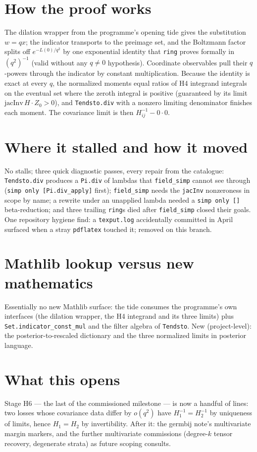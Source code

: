 \documentclass[11pt]{article}
\begin{document}
\section{How the proof works}

The dilation wrapper from the programme's opening tide gives the
substitution $w = qx$; the indicator transports to the preimage set,
and the Boltzmann factor splits off $e^{-L(0)/q^2}$ by one
exponential identity that \texttt{ring} proves formally in
$(q^2)^{-1}$ (valid without any $q \neq 0$ hypothesis). Coordinate
observables pull their $q$-powers through the indicator by constant
multiplication. Because the identity is exact at every $q$, the
normalized moments equal ratios of H4 integrand integrals on the
eventual set where the zeroth integral is positive (guaranteed by
its limit $\mathrm{jacInv}\,H \cdot Z_0 > 0$), and
\texttt{Tendsto.div} with a nonzero limiting denominator finishes
each moment. The covariance limit is then
$H^{-1}_{ij} - 0 \cdot 0$.

\section{Where it stalled and how it moved}

No stalls; three quick diagnostic passes, every repair from the
catalogue: \texttt{Tendsto.div} produces a \texttt{Pi.div} of
lambdas that \texttt{field\_simp} cannot see through
(\texttt{simp only [Pi.div\_apply]} first); \texttt{field\_simp}
needs the \texttt{jacInv} nonzeroness in scope by name; a rewrite
under an unapplied lambda needed a \texttt{simp only []}
beta-reduction; and three trailing \texttt{ring}s died after
\texttt{field\_simp} closed their goals. One repository hygiene find:
a \texttt{texput.log} accidentally committed in April surfaced when a
stray \texttt{pdflatex} touched it; removed on this branch.

\section{Mathlib lookup versus new mathematics}

Essentially no new Mathlib surface: the tide consumes the
programme's own interfaces (the dilation wrapper, the H4 integrand
and its three limits) plus \texttt{Set.indicator\_const\_mul} and
the filter algebra of \texttt{Tendsto}. New (project-level): the
posterior-to-rescaled dictionary and the three normalized limits in
posterior language.

\section{What this opens}

Stage H6 --- the last of the commissioned milestone --- is now a
handful of lines: two losses whose covariance data differ by
$o(q^2)$ have $H_1^{-1} = H_2^{-1}$ by uniqueness of limits, hence
$H_1 = H_2$ by invertibility. After it: the germbij note's
multivariate margin markers, and the further multivariate
commissions (degree-$k$ tensor recovery, degenerate strata) as
future scoping consults.
\end{document}
